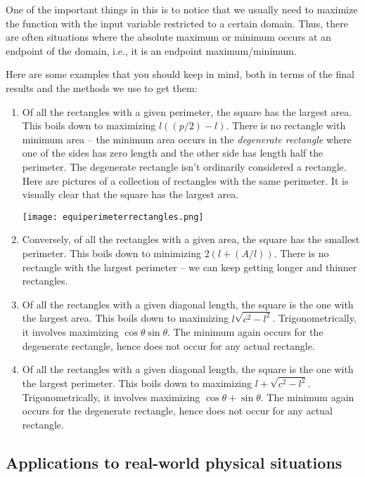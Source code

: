 \documentclass[10pt]{amsart}
\begin{document}
One of the important things in this is to notice that we usually need
to maximize the function with the input variable restricted to a
certain domain. Thus, there are often situations where the absolute
maximum or minimum occurs at an endpoint of the domain, i.e., it is an
endpoint maximum/minimum.

Here are some examples that you should keep in mind, both in terms of
the final results and the methods we use to get them:

\begin{enumerate}
\item Of all the rectangles with a given perimeter, the square has the
  largest area. This boils down to maximizing $l((p/2) - l)$. There is
  no rectangle with minimum area -- the minimum area occurs in the
  {\em degenerate rectangle} where one of the sides has zero length
  and the other side has length half the perimeter. The degenerate
  rectangle isn't ordinarily considered a rectangle. Here are pictures
  of a collection of rectangles with the same perimeter. It is
  visually clear that the square has the largest area.

  \texttt{[image: equiperimeterrectangles.png]}
\item Conversely, of all the rectangles with a given area, the square
  has the smallest perimeter. This boils down to minimizing $2(l +
  (A/l))$. There is no rectangle with the largest perimeter -- we can
  keep getting longer and thinner rectangles.
\item Of all the rectangles with a given diagonal length, the square
  is the one with the largest area. This boils down to maximizing
  $l\sqrt{c^2 - l^2}$. Trigonometrically, it involves maximizing $\cos
  \theta \sin \theta$. The minimum again occurs for the degenerate
  rectangle, hence does not occur for any actual rectangle.
\item Of all the rectangles with a given diagonal length, the square
  is the one with the largest perimeter. This boils down to maximizing
  $l + \sqrt{c^2 - l^2}$. Trigonometrically, it involves maximizing
  $\cos \theta + \sin \theta$. The minimum again occurs for the
  degenerate rectangle, hence does not occur for any actual rectangle.
\end{enumerate}

\subsection{Applications to real-world physical situations}
\end{document}
